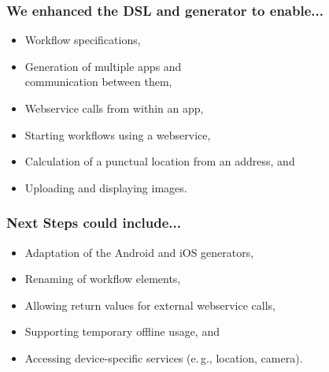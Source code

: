\begin{frame}
    \frametitle{We enhanced the DSL and generator to enable...}
    
    \begin{itemize}
    	\item Workflow specifications,
    	\item Generation of multiple apps and\\communication between them,
    	\item Webservice calls from within an app,
    	\item Starting workflows using a webservice,
    	\item Calculation of a punctual location from an address, and
    	\item Uploading and displaying images.
    \end{itemize}

\end{frame}

\begin{frame}
    \frametitle{Next Steps could include...}

	\begin{itemize}
		\item Adaptation of the Android and iOS generators,
		\item Renaming of workflow elements,
		\item Allowing return values for external webservice calls,
		\item Supporting temporary offline usage, and
		\item Accessing device-specific services (e.\,g., location, camera).
	\end{itemize}
\end{frame}

